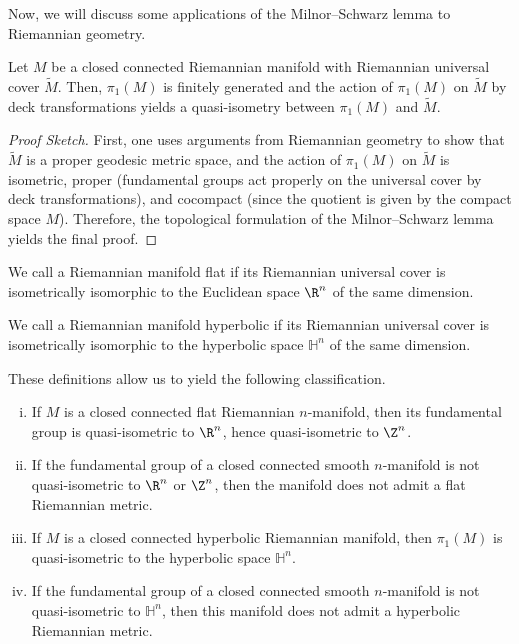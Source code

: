 \documentclass[10pt]{mypackage}
\begin{document}
Now, we will discuss some applications of the Milnor--Schwarz lemma to Riemannian geometry.
\begin{corollary}
  Let $M$ be a closed connected Riemannian manifold with Riemannian universal cover $ \widetilde{M} $. Then, $\pi_1(M)$ is finitely generated and the action of $\pi_1(M)$ on $ \widetilde{M} $ by deck transformations yields a quasi-isometry between $\pi_1(M)$ and $ \widetilde{M} $.
\end{corollary}
\begin{proof}[Proof Sketch]
  First, one uses arguments from Riemannian geometry to show that $ \widetilde{M} $ is a proper geodesic metric space, and the action of $ \pi_1(M) $ on $ \widetilde{M} $ is isometric, proper (fundamental groups act properly on the universal cover by deck transformations), and cocompact (since the quotient is given by the compact space $M$). Therefore, the topological formulation of the Milnor--Schwarz lemma yields the final proof.
\end{proof}
\begin{definition}
  We call a Riemannian manifold flat if its Riemannian universal cover is isometrically isomorphic to the Euclidean space $\R^n$ of the same dimension.

  We call a Riemannian manifold hyperbolic if its Riemannian universal cover is isometrically isomorphic to the hyperbolic space $ \mathbb{H}^n $ of the same dimension.
\end{definition}
These definitions allow us to yield the following classification.
\begin{corollary}\hfill
  \begin{enumerate}[(i)]
    \item If $M$ is a closed connected flat Riemannian $n$-manifold, then its fundamental group is quasi-isometric to $\R^n$, hence quasi-isometric to $\Z^n$.
    \item If the fundamental group of a closed connected smooth $n$-manifold is not quasi-isometric to $\R^n$ or $\Z^n$, then the manifold does not admit a flat Riemannian metric.
    \item If $M$ is a closed connected hyperbolic Riemannian manifold, then $\pi_1(M)$ is quasi-isometric to the hyperbolic space $ \mathbb{H}^n $.
    \item If the fundamental group of a closed connected smooth $n$-manifold is not quasi-isometric to $ \mathbb{H}^n $, then this manifold does not admit a hyperbolic Riemannian metric.
  \end{enumerate}
\end{corollary}
\end{document}
